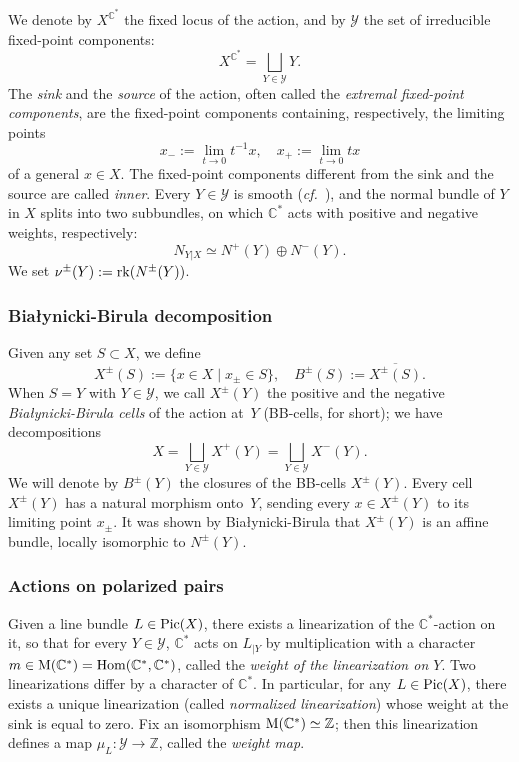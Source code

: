 \documentclass[10pt,a4paper]{article}
\numberwithin{equation}{section}
\theoremstyle{definition}
\theoremstyle{remark}
\def\C{{\mathbb C}}
\def\Z{{\mathbb Z}}
\def\cY{{\mathcal Y}}
\def\operatorname#1{\mathop{\rm #1}\nolimits}
\def\Hom{\operatorname{Hom}}
\def\Pic{\operatorname{Pic}}
\def\Hom{\operatorname{Hom}}
\def\rk{\operatorname{rk}}
\def\Mo{\operatorname{\hspace{0cm}M}}
\begin{document}
We denote by $X^{\C^*}$  the fixed locus of the action, and by $\cY$ the set of irreducible fixed-point components: 
$$X^{\C^*}=\bigsqcup_{Y\in \cY}Y.$$ 
 The {\em sink} and the {\em source} of the action, often called the {\em extremal fixed-point components}, are the fixed-point components containing, respectively, the limiting points 
$$
x_-:=\lim_{t\to 0}t^{-1}x, \quad x_+:=\lim_{t\to 0}tx
$$
of a general $x \in X$.  The fixed-point components different from the sink and the source are called {\em inner}.  Every $Y\in\cY$ is smooth (\textit{cf.}~\cite{IVERSEN}), and the normal bundle of $Y$ in $X$ splits into two subbundles, on which $\C^*$ acts with positive and negative weights, respectively:
\begin{equation}
N_{Y|X}\simeq N^+(Y)\oplus N^-(Y).
\label{eq:normal+-}
\end{equation}
We set $\nu^{\pm}(Y):=\rk (N^{\pm}(Y))$.

\subsubsection{Bia{\l}ynicki-Birula decomposition}
Given any set $S \subset X$, we define
\begin{equation}\label{eq:BBcells}
X^\pm(S):=\{x\in X\mid x_\pm\in S\}, \quad
B^\pm(S):=\overline{X^\pm(S)}.
\end{equation}
When $S=Y$ with $Y\in \cY$, we call $X^\pm(Y)$ the positive and the negative {\it Bia{\l}ynicki-Birula cells} of the action at~$Y$  (BB-cells, for short);  we have decompositions 
$$X=\bigsqcup_{Y\in\cY}X^+(Y)=\bigsqcup_{Y\in\cY}X^-(Y).$$  
We will denote by $B^\pm(Y)$ the closures of the BB-cells $X^\pm(Y)$. Every cell $X^\pm(Y)$ has a natural morphism onto~$Y$, sending every $x\in X^\pm(Y)$ to its limiting point $x_\pm$. It was shown by Bia{\l}ynicki-Birula that $X^\pm(Y)$ is an affine bundle, locally isomorphic to $N^\pm(Y)$.

\subsubsection{Actions on polarized pairs}\label{ssec:polar} Given  a line bundle $L\in \Pic(X)$, there exists a linearization of the $\C^*$-action on it, so that for every $Y\in \cY$, $\C^*$ acts on $L_{|Y}$ by multiplication with a character $m\in \Mo(\C^*)=\Hom(\C^*,\C^*)$, called the {\em weight of the linearization on $Y$}. Two linearizations differ by a character of $\C^*$. In particular, for any  $L \in \Pic(X)$, there exists a unique linearization (called {\em normalized linearization})  whose weight at the sink is equal to zero. 
Fix an isomorphism $\Mo(\C^*)\simeq \Z$; then  this linearization defines a map  $\mu_L\colon\cY\to\Z$, called the {\em weight map}. 
\end{document}
